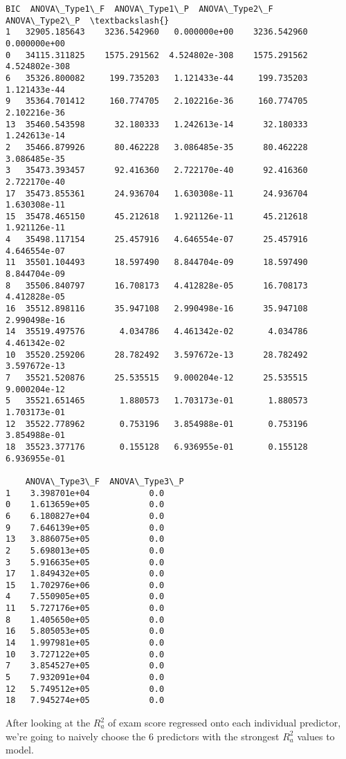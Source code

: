 \documentclass[11pt]{article}
\begin{document}
\begin{tcolorbox}[breakable, size=fbox, boxrule=.5pt, pad at break*=1mm, opacityfill=0]
\begin{Verbatim}[commandchars=\\\{\}]
             BIC  ANOVA\_Type1\_F  ANOVA\_Type1\_P  ANOVA\_Type2\_F  ANOVA\_Type2\_P  \textbackslash{}
1   32905.185643    3236.542960   0.000000e+00    3236.542960   0.000000e+00
0   34115.311825    1575.291562  4.524802e-308    1575.291562  4.524802e-308
6   35326.800082     199.735203   1.121433e-44     199.735203   1.121433e-44
9   35364.701412     160.774705   2.102216e-36     160.774705   2.102216e-36
13  35460.543598      32.180333   1.242613e-14      32.180333   1.242613e-14
2   35466.879926      80.462228   3.086485e-35      80.462228   3.086485e-35
3   35473.393457      92.416360   2.722170e-40      92.416360   2.722170e-40
17  35473.855361      24.936704   1.630308e-11      24.936704   1.630308e-11
15  35478.465150      45.212618   1.921126e-11      45.212618   1.921126e-11
4   35498.117154      25.457916   4.646554e-07      25.457916   4.646554e-07
11  35501.104493      18.597490   8.844704e-09      18.597490   8.844704e-09
8   35506.840797      16.708173   4.412828e-05      16.708173   4.412828e-05
16  35512.898116      35.947108   2.990498e-16      35.947108   2.990498e-16
14  35519.497576       4.034786   4.461342e-02       4.034786   4.461342e-02
10  35520.259206      28.782492   3.597672e-13      28.782492   3.597672e-13
7   35521.520876      25.535515   9.000204e-12      25.535515   9.000204e-12
5   35521.651465       1.880573   1.703173e-01       1.880573   1.703173e-01
12  35522.778962       0.753196   3.854988e-01       0.753196   3.854988e-01
18  35523.377176       0.155128   6.936955e-01       0.155128   6.936955e-01

    ANOVA\_Type3\_F  ANOVA\_Type3\_P
1    3.398701e+04            0.0
0    1.613659e+05            0.0
6    6.180827e+04            0.0
9    7.646139e+05            0.0
13   3.886075e+05            0.0
2    5.698013e+05            0.0
3    5.916635e+05            0.0
17   1.849432e+05            0.0
15   1.702976e+06            0.0
4    7.550905e+05            0.0
11   5.727176e+05            0.0
8    1.405650e+05            0.0
16   5.805053e+05            0.0
14   1.997981e+05            0.0
10   3.727122e+05            0.0
7    3.854527e+05            0.0
5    7.932091e+04            0.0
12   5.749512e+05            0.0
18   7.945274e+05            0.0
\end{Verbatim}
\end{tcolorbox}
        
    After looking at the \(R^2_{a}\) of exam score regressed onto each
individual predictor, we're going to naively choose the 6 predictors
with the strongest \(R^2_{a}\) values to model.
\end{document}
